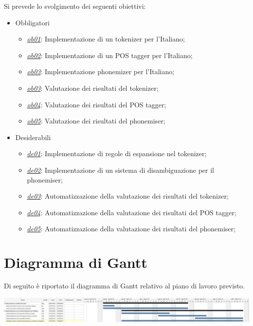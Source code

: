 \documentclass[11pt,notitlepage]{article}
\begin{document}
\bigskip
\bigskip
\noindent
Si prevede lo svolgimento dei seguenti obiettivi:
\begin{itemize}
	\item Obbligatori
	\begin{itemize}
		\item \underline{\textit{ob01}}: Implementazione di un tokenizer per l'Italiano;
		\item \underline{\textit{ob02}}: Implementazione di un POS tagger per l'Italiano;
		\item \underline{\textit{ob03}}: Implementazione phonemizer per l'Italiano;
		\item \underline{\textit{ob03}}: Valutazione dei risultati del tokenizer;
		\item \underline{\textit{ob04}}: Valutazione dei risultati del POS tagger;
		\item \underline{\textit{ob05}}: Valutazione dei risultati del phonemiser;
	\end{itemize}
	
	\item Desiderabili 
	\begin{itemize}
                \item \underline{\textit{de01}}: Implementazione di regole di espansione nel tokenizer;
                \item \underline{\textit{de02}}: Implementazione di un sistema di disambiguazione per il phonemiser;
                \item \underline{\textit{de03}}: Automatizzazione della valutazione dei risultati del tokenizer;
		\item \underline{\textit{de04}}: Automatizzazione della valutazione dei risultati del POS tagger;
		\item \underline{\textit{de05}}: Automatizzazione della valutazione dei risultati del phonemiser;
	\end{itemize}
\end{itemize}


\section*{Diagramma di Gantt}
Di seguito è riportato il diagramma di Gantt relativo al piano di lavoro previsto.
\newpage

\begin{landscape}
\begin{center}
\includegraphics[scale=0.40]{immagini/gantt.png}
\end{center}
\end{landscape}
\end{document}
